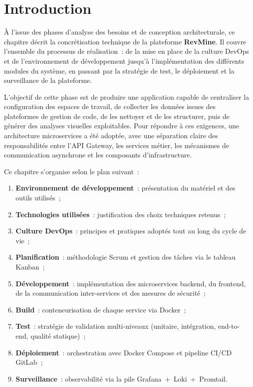 
\section{Introduction}

À l'issue des phases d'analyse des besoins et de conception architecturale, ce chapitre décrit
la concrétisation technique de la plateforme \textbf{RevMine}. Il couvre l'ensemble du processus
de réalisation~: de la mise en place de la culture DevOps et de l'environnement de développement
jusqu'à l'implémentation des différents modules du système, en passant par la stratégie de test,
le déploiement et la surveillance de la plateforme.

L'objectif de cette phase est de produire une application capable de centraliser la configuration
des espaces de travail, de collecter les données issues des plateformes de gestion de code, de les
nettoyer et de les structurer, puis de générer des analyses visuelles exploitables. Pour répondre
à ces exigences, une architecture microservices a été adoptée, avec une séparation claire des
responsabilités entre l'API Gateway, les services métier, les mécanismes de communication
asynchrone et les composants d'infrastructure.

Ce chapitre s'organise selon le plan suivant~:

\begin{enumerate}
    \item \textbf{Environnement de développement}~: présentation du matériel et des outils utilisés~;
    \item \textbf{Technologies utilisées}~: justification des choix techniques retenus~;
    \item \textbf{Culture DevOps}~: principes et pratiques adoptés tout au long du cycle de vie~;
    \item \textbf{Planification}~: méthodologie Scrum et gestion des tâches via le tableau Kanban~;
    \item \textbf{Développement}~: implémentation des microservices backend, du frontend, de la
          communication inter-services et des mesures de sécurité~;
    \item \textbf{Build}~: conteneurisation de chaque service via Docker~;
    \item \textbf{Test}~: stratégie de validation multi-niveaux (unitaire, intégration, end-to-end,
          qualité statique)~;
    \item \textbf{Déploiement}~: orchestration avec Docker Compose et pipeline CI/CD GitLab~;
    \item \textbf{Surveillance}~: observabilité via la pile Grafana~+~Loki~+~Promtail.
\end{enumerate}

